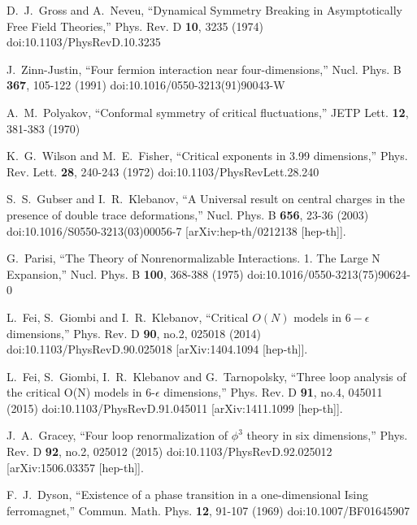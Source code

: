 \documentclass[aps,amsmath,amssymb,prd,showpacs,floatfix,preprint,superscriptaddress,nofootinbib,12pt]{article}
\begin{document}
\newpage

\begin{thebibliography}{99}

D.~J.~Gross and A.~Neveu,
``Dynamical Symmetry Breaking in Asymptotically Free Field Theories,''
Phys. Rev. D \textbf{10}, 3235 (1974)
doi:10.1103/PhysRevD.10.3235

J.~Zinn-Justin,
``Four fermion interaction near four-dimensions,''
Nucl. Phys. B \textbf{367}, 105-122 (1991)
doi:10.1016/0550-3213(91)90043-W

A.~M.~Polyakov,
``Conformal symmetry of critical fluctuations,''
JETP Lett. \textbf{12}, 381-383 (1970)

K.~G.~Wilson and M.~E.~Fisher,
``Critical exponents in 3.99 dimensions,''
Phys. Rev. Lett. \textbf{28}, 240-243 (1972)
doi:10.1103/PhysRevLett.28.240

S.~S.~Gubser and I.~R.~Klebanov,
``A Universal result on central charges in the presence of double trace deformations,''
Nucl. Phys. B \textbf{656}, 23-36 (2003)
doi:10.1016/S0550-3213(03)00056-7
[arXiv:hep-th/0212138 [hep-th]].

G.~Parisi,
``The Theory of Nonrenormalizable Interactions. 1. The Large N Expansion,''
Nucl. Phys. B \textbf{100}, 368-388 (1975)
doi:10.1016/0550-3213(75)90624-0

L.~Fei, S.~Giombi and I.~R.~Klebanov,
``Critical $O(N)$ models in $6-\epsilon$ dimensions,''
Phys. Rev. D \textbf{90}, no.2, 025018 (2014)
doi:10.1103/PhysRevD.90.025018
[arXiv:1404.1094 [hep-th]].

L.~Fei, S.~Giombi, I.~R.~Klebanov and G.~Tarnopolsky,
``Three loop analysis of the critical O(N) models in 6-$\epsilon$ dimensions,''
Phys. Rev. D \textbf{91}, no.4, 045011 (2015)
doi:10.1103/PhysRevD.91.045011
[arXiv:1411.1099 [hep-th]].

J.~A.~Gracey,
``Four loop renormalization of $\phi^3$ theory in six dimensions,''
Phys. Rev. D \textbf{92}, no.2, 025012 (2015)
doi:10.1103/PhysRevD.92.025012
[arXiv:1506.03357 [hep-th]].

F.~J.~Dyson,
``Existence of a phase transition in a one-dimensional Ising
  ferromagnet,''
Commun.  Math. Phys. \textbf{12}, 91-107 (1969)
doi:10.1007/BF01645907


\end{thebibliography}
\end{document}
